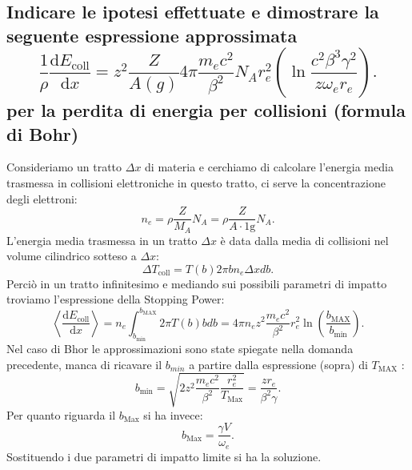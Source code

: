 \subsection[\hspace{1mm} Dimostrare la formula di perdita di energia per collisioni secondo le approssimazioni di Bhor]{Indicare le ipotesi effettuate e dimostrare la seguente espressione approssimata
\[
	\frac{1}{\rho}\frac{\mbox{d} E_{\text{coll}}}{\mbox{d} x} = z^2 \frac{Z}{A\left( g \right) } 4 \pi \frac{m_e c^2}{\beta^2}N_A r_e^2\left( \ln \frac{c^2\beta^3\gamma^2}{z \omega_e r_e} \right) 
.\] 
 per la perdita di energia per collisioni (formula di Bohr)
}
\label{sec:4.b.15}
Consideriamo un tratto $\Delta x$ di materia e cerchiamo di calcolare l'energia media trasmessa in collisioni elettroniche in questo tratto, ci serve la concentrazione degli elettroni:
\[
	n_e =\rho \frac{Z}{M_A}N_A = \rho \frac{Z}{A\cdot 1\text{g}}N_A
.\] 
L'energia media trasmessa in un tratto $\Delta x$ è data dalla media di collisioni nel volume cilindrico sotteso a $\Delta x$:
\[
	\Delta T_{\text{coll}} =T\left( b \right) 2 \pi b n_e \Delta x db
.\] 
Perciò in un tratto infinitesimo e mediando sui possibili parametri di impatto troviamo l'espressione della Stopping Power:
\[
	\left< \frac{\mbox{d} E_{\text{coll}}}{\mbox{d} x} \right> = n_e \int_{b_{\text{min}}}^{b_{\text{MAX}}} 2 \pi T\left( b \right) b db = 
	4 \pi n_e z^2 \frac{m_e c^2}{\beta^2} r_e^2 \ln\left( \frac{b_{\text{MAX}}}{b_{\text{min}}} \right) 
.\] 
Nel caso di Bhor le approssimazioni sono state spiegate nella domanda precedente, manca di ricavare il $b_{min}$ a partire dalla espressione (sopra) di $T_{\text{MAX}}$ :
\[
	b_{\text{min}}= \sqrt{2z^2 \frac{m_e c^2}{\beta^2} \frac{r_e^2}{T_{\text{Max}}} } =
	\frac{zr_e}{\beta^2 \gamma}
.\] 	
Per quanto riguarda il $b_{\text{Max}}$ si ha invece:
\[
	b_{\text{Max}} = \frac{\gamma V}{\omega_{e}}
.\] 
Sostituendo i due parametri di impatto limite si ha la soluzione.

